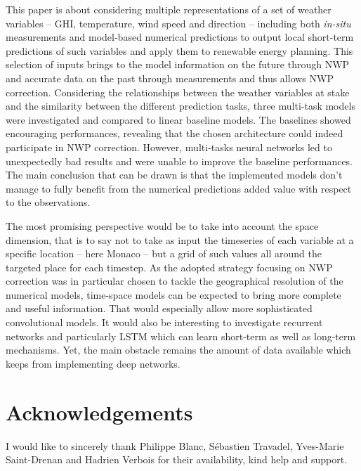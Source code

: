 \documentclass{article}
\newcommand{\saut}{\vspace{10px}}
\begin{document}
This paper is about considering multiple representations of a set of weather variables -- GHI, temperature, wind speed
and direction -- including both \emph{in-situ} measurements and model-based numerical predictions to
output local short-term predictions of such variables and apply them to renewable energy planning. This selection
of inputs brings to the model information on the future through NWP and accurate data on the past
through measurements and thus allows NWP correction.
Considering the relationships between the weather variables at stake and the similarity
between the different prediction tasks, three multi-task models were investigated and compared to linear baseline
models. The baselines showed encouraging performances, revealing that the chosen architecture could indeed
participate in NWP correction.
However, multi-tasks neural networks led to unexpectedly bad results and were unable to improve the baseline
performances. The main conclusion that can be drawn is that the implemented models don't manage to fully
benefit from the numerical predictions added value with respect to the observations.

\saut

The most promising perspective would be to take into account the space dimension, that is to say not to take as input
the timeseries of each variable at a specific location -- here Monaco -- but a grid of such values all around the
targeted place for each timestep.
As the adopted strategy focusing on NWP correction was in particular chosen to tackle the geographical resolution
of the numerical models, time-space models can be expected to bring more complete and useful information.
That would especially allow more sophisticated convolutional models.
It would also be interesting to investigate recurrent networks and particularly
LSTM which can learn short-term as well as long-term mechanisms. Yet, the main obstacle remains the amount of data
available which keeps from implementing deep networks.

\section*{Acknowledgements}

I would like to sincerely thank Philippe Blanc, Sébastien Travadel, Yves-Marie Saint-Drenan and Hadrien Verbois
for their availability, kind help and support.



\end{document}
